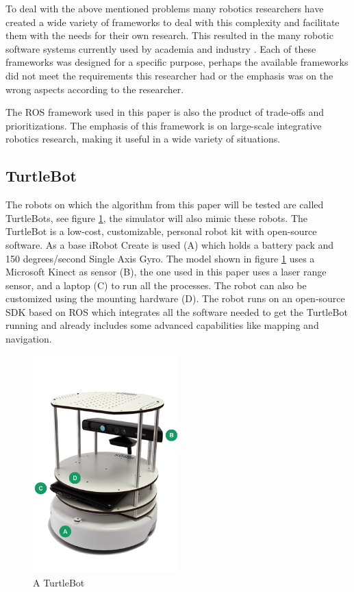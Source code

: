 \documentclass{ba-kecs}
\begin{document}
To deal with the above mentioned problems many robotics researchers have created a wide variety of frameworks to deal with this complexity and facilitate them with the needs for their own research. This resulted in the many robotic software systems currently used by academia and industry \cite{Kramer}. Each of these frameworks was designed for a specific purpose, perhaps the available frameworks did not meet the requirements this researcher had or the emphasis was on the wrong aspects according to the researcher.

The ROS framework used in this paper is also the product of trade-offs and prioritizations. The emphasis of this framework is on large-scale integrative robotics research, making it useful in a wide variety of situations.

\subsection{TurtleBot}
The robots on which the algorithm from this paper will be tested are called TurtleBots, see figure \ref{fig:turtlebot}, the simulator will also mimic these robots. The TurtleBot is a low-cost, customizable, personal robot kit with open-source software. As a base iRobot Create is used (A) which holds a battery pack and 150 degrees/second Single Axis Gyro. The model shown in figure  \ref{fig:turtlebot} uses a Microsoft Kinect as sensor (B), the one used in this paper uses a laser range sensor, and a laptop (C) to run all the processes. The robot can also be customized using the mounting hardware (D). The robot runs on an open-source SDK based on ROS which integrates all the software needed to get the TurtleBot running and already includes some advanced capabilities like mapping and navigation.

\begin{figure}[htbp]
	\centering
		\includegraphics[width=0.50\textwidth]{figures/turtlebot.png}
	\caption{A TurtleBot}
	\label{fig:turtlebot}
\end{figure}
\end{document}
